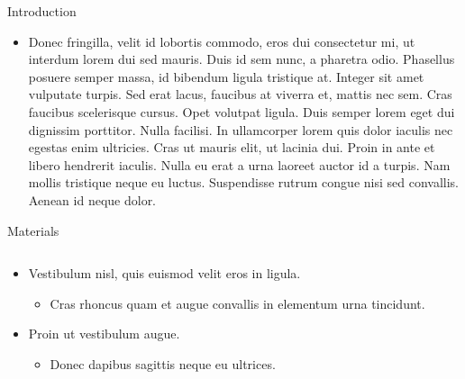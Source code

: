 \documentclass[final,hyperref={pdfpagelabels=false}]{beamer}
\begin{document}
\begin{frame}[t]
\begin{columns}[t]
\begin{column}{.465\textwidth}
\begin{block}{Introduction}

\begin{itemize}
\item Donec fringilla, velit id lobortis commodo, eros dui consectetur mi, ut interdum lorem dui sed mauris. Duis id sem nunc, a pharetra odio. Phasellus posuere \alert{semper massa}, id bibendum ligula tristique at. Integer sit amet vulputate turpis. Sed erat lacus, faucibus at viverra et, mattis nec sem. Cras faucibus \alert{scelerisque} cursus. Opet volutpat ligula. Duis semper lorem eget dui dignissim porttitor. Nulla facilisi. In ullamcorper lorem quis dolor iaculis nec egestas enim ultricies. Cras ut mauris elit, ut lacinia dui. Proin in ante et libero hendrerit iaculis. Nulla eu erat a urna laoreet auctor id a turpis. Nam mollis tristique neque eu luctus. Suspendisse rutrum congue nisi sed convallis. Aenean id neque dolor.
\end{itemize}

\end{block}


\begin{block}{Materials}

\begin{columns} %
\begin{column}{.54\textwidth} %
\begin{itemize}
\item Vestibulum nisl, quis euismod velit eros in ligula.
\begin{itemize}
\item Cras rhoncus quam et augue convallis in elementum urna tincidunt.
\end{itemize}
\item Proin ut vestibulum augue.
\begin{itemize}
\item Donec dapibus sagittis neque eu ultrices.
\end{itemize}
\end{itemize}
\end{column}


\end{columns}
\end{block}
\end{column}
\end{columns}
\end{frame}
\end{document}
